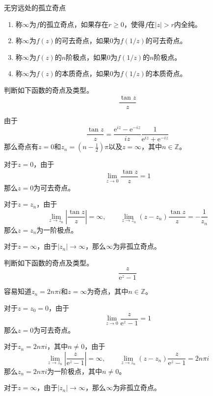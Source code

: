 \documentclass[lang = cn, scheme = chinese, thmcnt = section]{elegantbook}
\newcommand{\Z}{\mathbb{Z}}            %
\begin{document}
\begin{definition}{无穷远处的孤立奇点}
	\begin{enumerate}
		\item 称$\infty$为$f$的孤立奇点，如果存在$r\ge 0$，使得$f$在$|z|>r$内全纯。
		\item 称$\infty$为$f(z)$的可去奇点，如果$0$为$f(1/z)$的可去奇点。
		\item 称$\infty$为$f(z)$的$n$阶极点，如果$0$为$f(1/z)$的$n$阶极点。
		\item 称$\infty$为$f(z)$的本质奇点，如果$0$为$f(1/z)$的本质奇点。
	\end{enumerate}
\end{definition}

\begin{example}
	判断如下函数的奇点及类型。
	$$
	\frac{\tan z}{z}
	$$
\end{example}

\begin{solution}
	由于
	$$
	\frac{\tan z}{z}=\frac{\mathrm{e}^{iz}-\mathrm{e}^{-iz}}{iz}\frac{1}{\mathrm{e}^{iz}+\mathrm{e}^{-iz}}
	$$
	那么奇点有$z=0$和$z_n=(n-\frac{1}{2})\pi$以及$z=\infty$，其中$n\in\Z$。
	
	对于$z=0$，由于
	$$
	\lim_{z\to0}\frac{\tan z}{z}=1
	$$
	那么$z=0$为可去奇点。
	
	对于$z=z_n$，由于
	$$
	\lim_{z\to z_n}\left|\frac{\tan z}{z}\right|=\infty,\qquad
	\lim_{z\to z_n}(z-z_n)\frac{\tan z}{z}=-\frac{1}{z_n}
	$$
	那么$z=z_n$为一阶极点。
	
	对于$z=\infty$，由于$|z_n|\to\infty$，那么$\infty$为非孤立奇点。
\end{solution}

\begin{example}
	判断如下函数的奇点及类型。
	$$
	\frac{z}{\mathrm{e}^z-1}
	$$
\end{example}

\begin{solution}
	容易知道$z_n=2n\pi i$和$z=\infty$为奇点，其中$n\in\Z$。
	
	对于$z=z_0=0$​，由于
	$$
	\lim_{z\to 0}\frac{z}{\mathrm{e}^z-1}=1
	$$
	那么$z=0$为可去奇点。
	
	对于$z_n=2n\pi i$，其中$n\ne 0$，由于
	$$
	\lim_{z\to z_n}\left|\frac{z}{\mathrm{e}^z-1}\right|=\infty,\qquad
	\lim_{z\to z_n}(z-z_n)\frac{z}{\mathrm{e}^z-1}=2n\pi i
	$$
	那么$z_n=2n\pi i$为一阶极点，其中$n\ne 0$。
	
	对于$z=\infty$，由于$|z_n|\to\infty$，那么$\infty$为非孤立奇点。
\end{solution}
\end{document}
